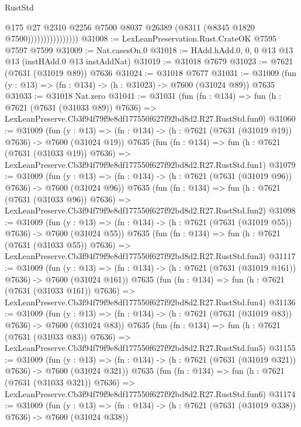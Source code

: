 \begin{lexlean}{RustStd}
\begin{coremodule}
                                @175
                                @27
                                @2310
                                @2256
                                @7500
                                @8037
                                @26389
                                (@8311 (@8345 @1820 @7500))))))))))))))))
@31008 := LexLeanPreservation.Rust.CrateOK @7595 @7597 @7599
@31009 := Nat.casesOn.{0}
@31018 := HAdd.hAdd.{0, 0, 0} @13 @13 @13 (instHAdd.{0} @13 instAddNat)
@31019 := @31018 @7679
@31023 := @7621 (@7631 (@31019 @89)) @7636
@31024 := @31018 @7677
@31031 := @31009 (fun (y : @13) => (fn : @134) -> (h : @31023) -> @7600 (@31024 @89)) @7635
@31033 := @31018 Nat.zero
@31041 := @31031
    (fun (fn : @134) =>
    fun (h : @7621 (@7631 (@31033 @89)) @7636) =>
    LexLeanPreserve.Cb3f94f79f9e8df177550f627f92bd8d2.R27.RustStd.fun0)
@31060 := @31009
    (fun (y : @13) => (fn : @134) -> (h : @7621 (@7631 (@31019 @19)) @7636) -> @7600 (@31024 @19))
    @7635
    (fun (fn : @134) =>
    fun (h : @7621 (@7631 (@31033 @19)) @7636) =>
    LexLeanPreserve.Cb3f94f79f9e8df177550f627f92bd8d2.R27.RustStd.fun1)
@31079 := @31009
    (fun (y : @13) => (fn : @134) -> (h : @7621 (@7631 (@31019 @96)) @7636) -> @7600 (@31024 @96))
    @7635
    (fun (fn : @134) =>
    fun (h : @7621 (@7631 (@31033 @96)) @7636) =>
    LexLeanPreserve.Cb3f94f79f9e8df177550f627f92bd8d2.R27.RustStd.fun2)
@31098 := @31009
    (fun (y : @13) => (fn : @134) -> (h : @7621 (@7631 (@31019 @55)) @7636) -> @7600 (@31024 @55))
    @7635
    (fun (fn : @134) =>
    fun (h : @7621 (@7631 (@31033 @55)) @7636) =>
    LexLeanPreserve.Cb3f94f79f9e8df177550f627f92bd8d2.R27.RustStd.fun3)
@31117 := @31009
    (fun (y : @13) => (fn : @134) -> (h : @7621 (@7631 (@31019 @161)) @7636) -> @7600 (@31024 @161))
    @7635
    (fun (fn : @134) =>
    fun (h : @7621 (@7631 (@31033 @161)) @7636) =>
    LexLeanPreserve.Cb3f94f79f9e8df177550f627f92bd8d2.R27.RustStd.fun4)
@31136 := @31009
    (fun (y : @13) => (fn : @134) -> (h : @7621 (@7631 (@31019 @83)) @7636) -> @7600 (@31024 @83))
    @7635
    (fun (fn : @134) =>
    fun (h : @7621 (@7631 (@31033 @83)) @7636) =>
    LexLeanPreserve.Cb3f94f79f9e8df177550f627f92bd8d2.R27.RustStd.fun5)
@31155 := @31009
    (fun (y : @13) => (fn : @134) -> (h : @7621 (@7631 (@31019 @321)) @7636) -> @7600 (@31024 @321))
    @7635
    (fun (fn : @134) =>
    fun (h : @7621 (@7631 (@31033 @321)) @7636) =>
    LexLeanPreserve.Cb3f94f79f9e8df177550f627f92bd8d2.R27.RustStd.fun6)
@31174 := @31009
    (fun (y : @13) => (fn : @134) -> (h : @7621 (@7631 (@31019 @338)) @7636) -> @7600 (@31024 @338))

\end{coremodule}
\end{lexlean}
